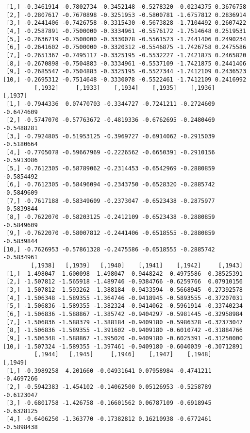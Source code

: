 \documentclass[
  letterpaper,
  DIV=11,
  numbers=noendperiod]{scrreprt}
\begin{document}
\begin{verbatim}
 [1,] -0.3461914 -0.7802734 -0.3452148 -0.5278320 -0.0234375 0.3676758
 [2,] -0.2807617 -0.7670898 -0.3251953 -0.5800781 -1.6757812 0.2836914
 [3,] -0.2441406 -0.7426758 -0.3315430 -0.5673828 -1.7104492 0.2607422
 [4,] -0.2587891 -0.7500000 -0.3334961 -0.5576172 -1.7514648 0.2519531
 [5,] -0.2636719 -0.7500000 -0.3330078 -0.5561523 -1.7441406 0.2490234
 [6,] -0.2641602 -0.7500000 -0.3320312 -0.5546875 -1.7426758 0.2475586
 [7,] -0.2651367 -0.7495117 -0.3325195 -0.5532227 -1.7421875 0.2465820
 [8,] -0.2670898 -0.7504883 -0.3334961 -0.5537109 -1.7421875 0.2441406
 [9,] -0.2685547 -0.7504883 -0.3325195 -0.5527344 -1.7412109 0.2436523
[10,] -0.2695312 -0.7514648 -0.3330078 -0.5522461 -1.7412109 0.2416992
         [,1932]     [,1933]    [,1934]    [,1935]    [,1936]    [,1937]
 [1,] -0.7944336  0.07470703 -0.3344727 -0.7241211 -0.2724609 -0.6474609
 [2,] -0.5747070 -0.57763672 -0.4819336 -0.6762695 -0.2480469 -0.5488281
 [3,] -0.7924805 -0.51953125 -0.3969727 -0.6914062 -0.2915039 -0.5180664
 [4,] -0.7705078 -0.59667969 -0.2226562 -0.6650391 -0.2910156 -0.5913086
 [5,] -0.7612305 -0.58789062 -0.2314453 -0.6542969 -0.2880859 -0.5854492
 [6,] -0.7612305 -0.58496094 -0.2343750 -0.6528320 -0.2885742 -0.5849609
 [7,] -0.7617188 -0.58349609 -0.2373047 -0.6523438 -0.2875977 -0.5839844
 [8,] -0.7622070 -0.58203125 -0.2412109 -0.6523438 -0.2880859 -0.5849609
 [9,] -0.7622070 -0.58007812 -0.2441406 -0.6518555 -0.2880859 -0.5839844
[10,] -0.7626953 -0.57861328 -0.2475586 -0.6518555 -0.2885742 -0.5834961
        [,1938]   [,1939]   [,1940]    [,1941]    [,1942]     [,1943]
 [1,] -1.498047 -1.600098  1.498047 -0.9448242 -0.4975586 -0.38525391
 [2,] -1.507812 -1.565918 -1.489746 -0.9384766 -0.6259766  0.07910156
 [3,] -1.507812 -1.593262 -1.388184 -0.9433594 -0.5668945 -0.27392578
 [4,] -1.506348 -1.589355 -1.364746 -0.9418945 -0.5893555 -0.37207031
 [5,] -1.506836 -1.589355 -1.382324 -0.9414062 -0.5961914 -0.33740234
 [6,] -1.506836 -1.588867 -1.385742 -0.9404297 -0.5981445 -0.32958984
 [7,] -1.506836 -1.588379 -1.388184 -0.9409180 -0.5986328 -0.32373047
 [8,] -1.506836 -1.589355 -1.391602 -0.9409180 -0.6010742 -0.31884766
 [9,] -1.506348 -1.588867 -1.395020 -0.9409180 -0.6025391 -0.31250000
[10,] -1.507324 -1.589355 -1.397461 -0.9409180 -0.6040039 -0.30712891
         [,1944]   [,1945]     [,1946]    [,1947]    [,1948]    [,1949]
 [1,] -0.3989258  4.201660 -0.04931641 0.07958984 -0.4741211 -0.4697266
 [2,] -0.5942383 -1.454102 -0.14062500 0.05126953 -0.5258789 -0.6123047
 [3,] -0.6801758 -1.426758 -0.16601562 0.06787109 -0.6918945 -0.6328125
 [4,] -0.6406250 -1.363770 -0.17382812 0.16210938 -0.6772461 -0.5898438

\end{verbatim}
\end{document}
